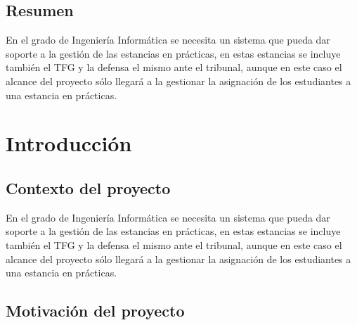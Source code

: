 \documentclass[pdftex,11pt,a4paper]{book}
\begin{document}

\thispagestyle{empty} %

\clearpage %

\section*{Resumen}

En el grado de Ingeniería Informática se necesita un sistema que pueda dar soporte a la gestión de las estancias en prácticas, en estas estancias se incluye también el TFG y la defensa el mismo ante el tribunal, aunque en este caso el alcance del proyecto sólo llegará a la gestionar la asignación de los estudiantes a una estancia en prácticas. 

\thispagestyle{empty} %

\cleardoublepage




\pagestyle{plain} %

\tableofcontents

\cleardoublepage


\chapter{Introducción}

\section{Contexto del proyecto}

En el grado de Ingeniería Informática se necesita un sistema que pueda dar soporte a la gestión de las estancias en prácticas, en estas estancias se incluye también el TFG y la defensa el mismo ante el tribunal, aunque en este caso el alcance del proyecto sólo llegará a la gestionar la asignación de los estudiantes a una estancia en prácticas.

\section{Motivación del proyecto}
\end{document}
